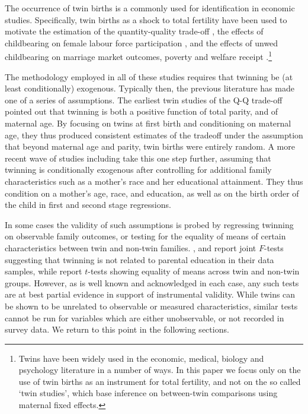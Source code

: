 The occurrence of twin births is a commonly used for identification in economic
studies.  Specifically, twin births as a shock to total fertility have been used
to motivate the estimation of the quantity-quality trade-off 
\citep{RosenzweigWolpin1980,Blacketal2005,Angristetal2010,Caceres2006}, the 
effects of childbearing on female labour force participation 
\citep{RosenzweigWolpin1980b,Jacobsenetal1999,AngristEvans1998}, and the effects 
of unwed childbearing on marriage market outcomes, poverty and welfare receipt 
\citep{BronarsGrogger1994}.\footnote{Twins have been widely used in the economic, 
medical, biology and psychology literature in a number of ways.  In this paper we 
focus only on the use of twin births as an instrument for total fertility, and 
not on the so called `twin studies', which base inference on between-twin 
comparisons using maternal fixed effects.}

The methodology employed in all of these studies requires that twinning be (at 
least conditionally) exogenous.  Typically then, the previous literature has made 
one of a series of assumptions.  The earliest twin studies of the Q-Q trade-off 
\citep{RosenzweigWolpin1980,RosenzweigWolpin1980b} pointed out that twinning 
is both a positive function of total parity, and of maternal age.  By focusing
on twins at first birth and conditioning on maternal age, they thus produced 
consistent estimates of the tradeoff under the assumption that beyond maternal 
age and parity, twin births were entirely random.  A more recent wave of studies 
including \citet{Blacketal2005,Caceres2006,Lietal2008,Angristetal2010} take this 
one step further, assuming that twinning is conditionally exogenous after 
controlling for additional family characteristics such as a mother's race and her 
educational attainment.  They thus condition on a mother's age, race, and 
education, as well as on the birth order of the child in first and second stage 
regressions.

In some cases the validity of such assumptions is probed by regressing twinning
on observable family outcomes, or testing for the equality of means of certain 
characteristics between twin and non-twin families. \citet{Blacketal2005}, 
\citet{Lietal2008} and \citet{Sanhueza2009} report joint $F$-tests suggesting that
twinning is not related to parental education in their data samples, while 
\citet{RosenzweigZhang2009} report $t$-tests showing equality of means across twin 
and non-twin groups. However, as is well known and acknowledged in each case, any 
such tests are at best partial evidence in support of instrumental validity.  While 
twins can be shown to be unrelated to observable or measured characteristics, 
similar tests cannot be run for variables which are either unobservable, or not 
recorded in survey data. We return to this point in the following sections.

